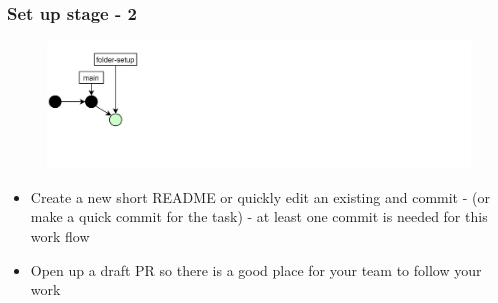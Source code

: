 \documentclass[aspectratio=169]{beamer} %
\begin{document}
\begin{frame}
	\frametitle{Set up stage - 2}

	\vspace{-.5cm}
	\begin{minipage}[t][5cm][t]{\textwidth}
		\begin{figure}
			\centering
			\includegraphics[width=\textwidth]{./img/dime-gitflow-network-1-1.png}
		\end{figure}
	\end{minipage}

	\vspace{-.5cm}
	\begin{minipage}[t][5cm][t]{\textwidth}
		\begin{itemize}
			\setlength\itemsep{.5em}
			\item Create a new short README or quickly edit an existing and commit - (or make a quick commit for the task) - at least one commit is needed for this work flow
			\item Open up a draft PR so there is a good place for your team to follow your work
		\end{itemize}
	\end{minipage}

\end{frame}
\end{document}
